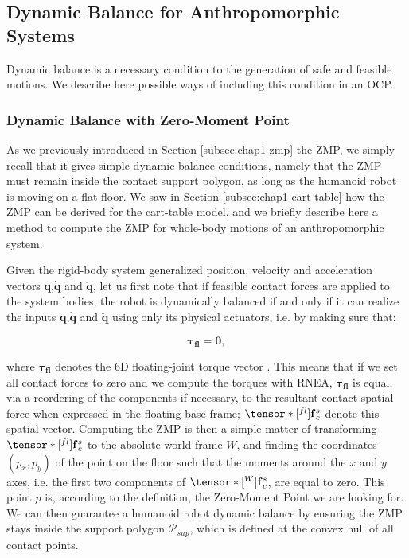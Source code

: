\subsection{Dynamic Balance for Anthropomorphic Systems}

Dynamic balance is a necessary condition to the generation of safe and
feasible motions. We describe here possible ways of including this
condition in an OCP.

\subsubsection{Dynamic Balance with Zero-Moment Point}

As we previously introduced in Section \ref{subsec:chap1-zmp} the ZMP,
we simply recall that it gives simple dynamic balance conditions,
namely that the ZMP must remain inside the contact support polygon, as
long as the humanoid robot is moving on a flat floor. We saw in
Section \ref{subsec:chap1-cart-table} how the ZMP can be derived for
the cart-table model, and we briefly describe here a method to compute
the ZMP for whole-body motions of an anthropomorphic system.

Given the rigid-body system generalized position, velocity and
acceleration vectors $\mathbf{q}$,$\dot{\mathbf{q}}$ and
$\ddot{\mathbf{q}}$, let us first note that if feasible contact forces
are applied to the system bodies, the robot is dynamically balanced if
and only if it can realize the inputs $\mathbf{q}$,$\dot{\mathbf{q}}$
and $\ddot{\mathbf{q}}$ using only its physical actuators, i.e. by
making sure that:

\begin{equation}
\label{eq:chap3-dynamic-balance-inverse}
 \boldsymbol{\tau_{fl}}=\mathbf{0},
\end{equation}

where $\boldsymbol{\tau_{fl}}$ denotes the 6D floating-joint torque
vector \cite{hirukawa2006universal}. This means that if we set all
contact forces to zero and we compute the torques with RNEA,
$\boldsymbol{\tau_{fl}}$ is equal, via a reordering of the components
if necessary, to the resultant contact spatial force when expressed in
the floating-base frame; $\tensor*[^{fl}]{\mathbf{f}}{_c^s}$ denote
this spatial vector. Computing the ZMP is then a simple matter of
transforming $\tensor*[^{fl}]{\mathbf{f}}{_c^s}$ to the absolute world
frame $W$, and finding the coordinates $(p_x,p_y)$ of the point on the
floor such that the moments around the $x$ and $y$ axes, i.e. the
first two components of $\tensor*[^W]{\mathbf{f}}{_c^s}$, are equal to
zero. This point $p$ is, according to the definition, the Zero-Moment
Point we are looking for. We can then guarantee a humanoid robot
dynamic balance by ensuring the ZMP stays inside the support polygon
$\mathcal{P}_{sup}$, which is defined at the convex hull of all
contact points.

